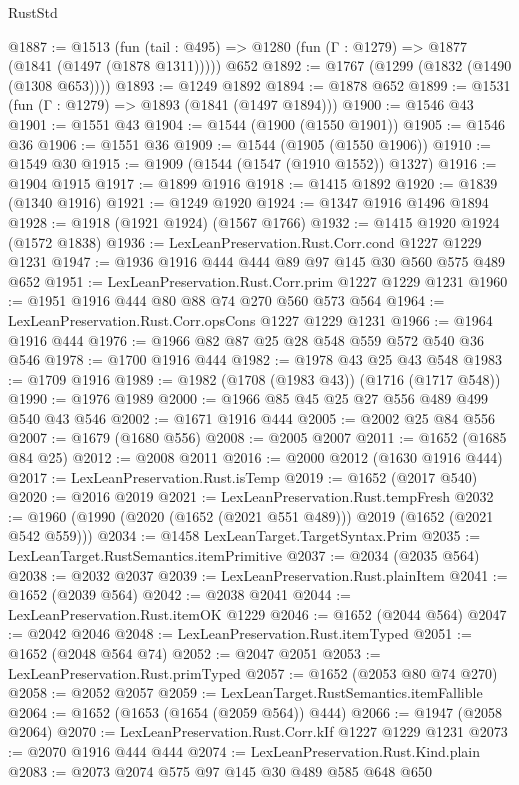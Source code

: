 \begin{lexlean}{RustStd}
\begin{coremodule}
@1887 := @1513
    (fun (tail : @495) => @1280 (fun (Γ : @1279) => @1877 (@1841 (@1497 (@1878 @1311)))))
    @652
@1892 := @1767 (@1299 (@1832 (@1490 (@1308 @653))))
@1893 := @1249 @1892
@1894 := @1878 @652
@1899 := @1531 (fun (Γ : @1279) => @1893 (@1841 (@1497 @1894)))
@1900 := @1546 @43
@1901 := @1551 @43
@1904 := @1544 (@1900 (@1550 @1901))
@1905 := @1546 @36
@1906 := @1551 @36
@1909 := @1544 (@1905 (@1550 @1906))
@1910 := @1549 @30
@1915 := @1909 (@1544 (@1547 (@1910 @1552)) @1327)
@1916 := @1904 @1915
@1917 := @1899 @1916
@1918 := @1415 @1892
@1920 := @1839 (@1340 @1916)
@1921 := @1249 @1920
@1924 := @1347 @1916 @1496 @1894
@1928 := @1918 (@1921 @1924) (@1567 @1766)
@1932 := @1415 @1920 @1924 (@1572 @1838)
@1936 := LexLeanPreservation.Rust.Corr.cond @1227 @1229 @1231
@1947 := @1936 @1916 @444 @444 @89 @97 @145 @30 @560 @575 @489 @652
@1951 := LexLeanPreservation.Rust.Corr.prim @1227 @1229 @1231
@1960 := @1951 @1916 @444 @80 @88 @74 @270 @560 @573 @564
@1964 := LexLeanPreservation.Rust.Corr.opsCons @1227 @1229 @1231
@1966 := @1964 @1916 @444
@1976 := @1966 @82 @87 @25 @28 @548 @559 @572 @540 @36 @546
@1978 := @1700 @1916 @444
@1982 := @1978 @43 @25 @43 @548
@1983 := @1709 @1916
@1989 := @1982 (@1708 (@1983 @43)) (@1716 (@1717 @548))
@1990 := @1976 @1989
@2000 := @1966 @85 @45 @25 @27 @556 @489 @499 @540 @43 @546
@2002 := @1671 @1916 @444
@2005 := @2002 @25 @84 @556
@2007 := @1679 (@1680 @556)
@2008 := @2005 @2007
@2011 := @1652 (@1685 @84 @25)
@2012 := @2008 @2011
@2016 := @2000 @2012 (@1630 @1916 @444)
@2017 := LexLeanPreservation.Rust.isTemp
@2019 := @1652 (@2017 @540)
@2020 := @2016 @2019
@2021 := LexLeanPreservation.Rust.tempFresh
@2032 := @1960 (@1990 (@2020 (@1652 (@2021 @551 @489))) @2019 (@1652 (@2021 @542 @559)))
@2034 := @1458 LexLeanTarget.TargetSyntax.Prim
@2035 := LexLeanTarget.RustSemantics.itemPrimitive
@2037 := @2034 (@2035 @564)
@2038 := @2032 @2037
@2039 := LexLeanPreservation.Rust.plainItem
@2041 := @1652 (@2039 @564)
@2042 := @2038 @2041
@2044 := LexLeanPreservation.Rust.itemOK @1229
@2046 := @1652 (@2044 @564)
@2047 := @2042 @2046
@2048 := LexLeanPreservation.Rust.itemTyped
@2051 := @1652 (@2048 @564 @74)
@2052 := @2047 @2051
@2053 := LexLeanPreservation.Rust.primTyped
@2057 := @1652 (@2053 @80 @74 @270)
@2058 := @2052 @2057
@2059 := LexLeanTarget.RustSemantics.itemFallible
@2064 := @1652 (@1653 (@1654 (@2059 @564)) @444)
@2066 := @1947 (@2058 @2064)
@2070 := LexLeanPreservation.Rust.Corr.kIf @1227 @1229 @1231
@2073 := @2070 @1916 @444 @444
@2074 := LexLeanPreservation.Rust.Kind.plain
@2083 := @2073 @2074 @575 @97 @145 @30 @489 @585 @648 @650

\end{coremodule}
\end{lexlean}
